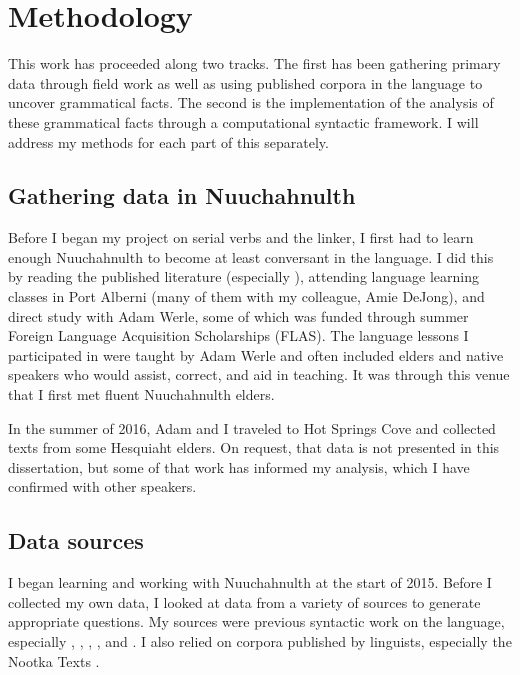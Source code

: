 \chapter{Methodology}
\label{sec:methodology}

This work has proceeded along two tracks. The first has been gathering primary data through field work as well as using published corpora in the language to uncover grammatical facts. The second is the implementation of the analysis of these grammatical facts through a computational syntactic framework. I will address my methods for each part of this separately.

\section{Gathering data in Nuuchahnulth} \label{sec:method:ncn}

Before I began my project on serial verbs and the linker, I first had to learn enough Nuuchahnulth to become at least conversant in the language. I did this by reading the published literature (especially \citealt{sapir1939}), attending language learning classes in Port Alberni (many of them with my colleague, Amie DeJong), and direct study with Adam Werle, some of which was funded through summer Foreign Language Acquisition Scholarships (FLAS). The language lessons I participated in were taught by Adam Werle and often included elders and native speakers who would assist, correct, and aid in teaching. It was through this venue that I first met fluent Nuuchahnulth elders.

In the summer of 2016, Adam and I traveled to Hot Springs Cove and collected texts from some Hesquiaht elders. On request, that data is not presented in this dissertation, but some of that work has informed my analysis, which I have confirmed with other speakers.

\section{Data sources} \label{sec:method:sources}

I began learning and working with Nuuchahnulth at the start of 2015. Before I collected my own data, I looked at data from a variety of sources to generate appropriate questions. My sources were previous syntactic work on the language, especially \cite{jacobsen1993}, \cite{nakayama2001}, \cite{wojdak2003}, \cite{waldie2004}, and \cite{woo2007b}. I also relied on corpora published by linguists, especially the Nootka Texts \citep{sapir1924, sapir1939, sapir1955, whalingindians2000, whalingindians2004, whalingindians2009}.

